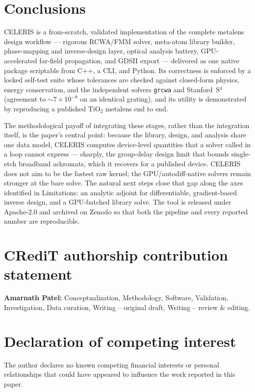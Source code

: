 \documentclass[preprint,12pt]{elsarticle}
\begin{document}
\section{Conclusions}
CELERIS is a from-scratch, validated implementation of the complete metalens design
workflow --- rigorous RCWA/FMM solver, meta-atom library builder, phase-mapping and
inverse-design layer, optical analysis battery, GPU-accelerated far-field
propagation, and GDSII export --- delivered as one native package scriptable from
C++, a CLI, and Python. Its correctness is enforced by a locked self-test suite
whose tolerances are checked against closed-form physics, energy conservation, and
the independent solvers \texttt{grcwa} and Stanford~S$^4$ (agreement to
$\sim$$7\times10^{-8}$ on an identical grating), and its utility is demonstrated by
reproducing a published TiO$_2$ metalens end to end.

The methodological payoff of integrating these stages, rather than the integration
itself, is the paper's central point: because the library, design, and analysis
share one data model, CELERIS computes device-level quantities that a solver called
in a loop cannot express --- sharply, the group-delay design limit that bounds
single-etch broadband achromats, which it recovers for a published device. CELERIS
does not aim to be the fastest raw kernel; the GPU/autodiff-native solvers remain
stronger at the bare solve. The natural next steps close that gap along the axes
identified in Limitations: an analytic adjoint for differentiable, gradient-based
inverse design, and a GPU-batched library solve. The tool is released under Apache-2.0
and archived on Zenodo so that both the pipeline and every reported number are
reproducible.

\section*{CRediT authorship contribution statement}
\textbf{Amarnath Patel:} Conceptualization, Methodology, Software, Validation,
Investigation, Data curation, Writing -- original draft, Writing -- review \& editing.

\section*{Declaration of competing interest}
The author declares no known competing financial interests or personal relationships
that could have appeared to influence the work reported in this paper.
\end{document}
